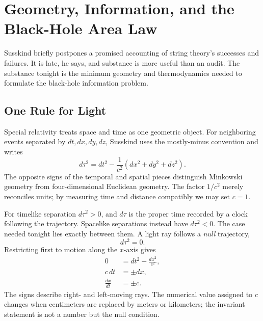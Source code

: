 \chapter{Geometry, Information, and the Black-Hole Area Law}


Susskind briefly postpones a promised accounting of string theory's successes and failures.  It is late, he says, and substance is more useful than an audit.  The substance tonight is the minimum geometry and thermodynamics needed to formulate the black-hole information problem.

\section{One Rule for Light}

Special relativity treats space and time as one geometric object.  For neighboring events separated by \(dt,dx,dy,dz\), Susskind uses the mostly-minus convention and writes
\begin{equation}
d\tau^2=dt^2-\frac{1}{c^2}\left(dx^2+dy^2+dz^2\right).
\end{equation}
The opposite signs of the temporal and spatial pieces distinguish Minkowski geometry from four-dimensional Euclidean geometry.  The factor \(1/c^2\) merely reconciles units; by measuring time and distance compatibly we may set \(c=1\).

For timelike separation \(d\tau^2>0\), and \(d\tau\) is the proper time recorded by a clock following the trajectory.  Spacelike separations instead have \(d\tau^2<0\).  The case needed tonight lies exactly between them.  A light ray follows a \emph{null} trajectory,
\begin{equation}
d\tau^2=0.
\end{equation}
Restricting first to motion along the \(x\)-axis gives
\begin{align}
0&=dt^2-\frac{dx^2}{c^2},\\
c\,dt&=\pm dx,\\
\frac{dx}{dt}&=\pm c.
\end{align}
The signs describe right- and left-moving rays.  The numerical value assigned to \(c\) changes when centimeters are replaced by meters or kilometers; the invariant statement is not a number but the null condition.

